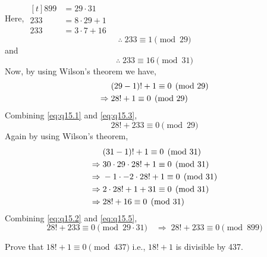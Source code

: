 \documentclass[12pt]{book}
\begin{document}
\begin{soln}
    Here, $ \begin{aligned}[t]
        899&=29\cdot31\\
        233&=8\cdot29+1\\
        233&=3\cdot7+16
    \end{aligned} $
    \begin{equation}
        \therefore \;233\equiv1\pmod{29}\label{eq:q15.1}
    \end{equation}
    and
    \begin{equation}
        \therefore \;233\equiv16\pmod{31}\label{eq:q15.2}
    \end{equation}
    Now, by using Wilson's theorem we have,
    \begin{align}
        & (29-1)!+1\equiv 0\pmod{29}\notag\\
        \Rightarrow\;& 28!+1\equiv 0\pmod{29}\label{eq:q15.3}
    \end{align}
    Combining \eqref{eq:q15.1} and \eqref{eq:q15.3},
    \begin{equation}
        28!+233\equiv0\pmod{29}\label{eq:q15.4}
    \end{equation} 
    Again by using Wilson's theorem,
    \begin{align}
        & (31-1)!+1\equiv 0\pmod{31}\notag\\
        \Rightarrow\;& 30\cdot 29\cdot 28!+1\equiv 0\pmod{31}\notag\\
        \Rightarrow\;& -1\cdot -2\cdot 28!+1\equiv 0\pmod{31}\notag\\
        \Rightarrow\;& 2\cdot 28!+1+31\equiv 0\pmod{31}\notag\\
        \Rightarrow\;& 28!+16\equiv 0\pmod{31}\label{eq:q15.5}
    \end{align}
    Combining \eqref{eq:q15.2} and \eqref{eq:q15.5},
    \[
        28!+233\equiv 0\pmod{29\cdot31} \quad \Rightarrow\; 28!+233\equiv 0\pmod{899}
    \]
\end{soln}
\begin{qn}
    Prove that $ 18!+1 \equiv 0\pmod{437} $ i.e., $ 18!+1 $ is divisible by 437.
\end{qn}
\end{document}
